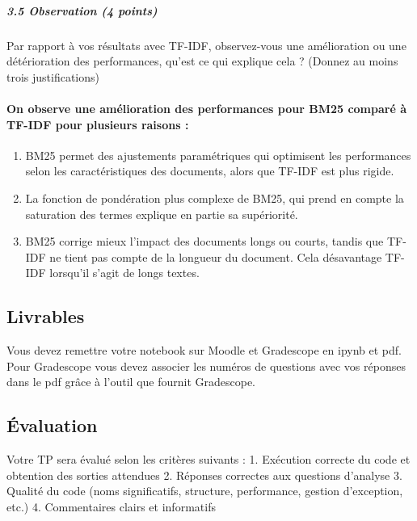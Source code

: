 \documentclass[11pt]{article}
\providecommand{\tightlist}{%
      \setlength{\itemsep}{0pt}\setlength{\parskip}{0pt}}
\begin{document}
    \subparagraph{3.5 Observation (4 points)}\label{observation-4-points}

Par rapport à vos résultats avec TF-IDF, observez-vous une amélioration
ou une détérioration des performances, qu'est ce qui explique cela ?
(Donnez au moins trois justifications)

    \paragraph{On observe une amélioration des performances pour BM25
comparé à TF-IDF pour plusieurs raisons
:}\label{on-observe-une-amuxe9lioration-des-performances-pour-bm25-comparuxe9-uxe0-tf-idf-pour-plusieurs-raisons}

\begin{enumerate}
\def\labelenumi{\arabic{enumi}.}
\tightlist
\item
  BM25 permet des ajustements paramétriques qui optimisent les
  performances selon les caractéristiques des documents, alors que
  TF-IDF est plus rigide.
\item
  La fonction de pondération plus complexe de BM25, qui prend en compte
  la saturation des termes explique en partie sa supériorité.
\item
  BM25 corrige mieux l'impact des documents longs ou courts, tandis que
  TF-IDF ne tient pas compte de la longueur du document. Cela
  désavantage TF-IDF lorsqu'il s'agit de longs textes.
\end{enumerate}

    \subsection{Livrables}\label{livrables}

Vous devez remettre votre notebook sur Moodle et Gradescope en ipynb et
pdf. Pour Gradescope vous devez associer les numéros de questions avec
vos réponses dans le pdf grâce à l'outil que fournit Gradescope.

\subsection{Évaluation}\label{uxe9valuation}

Votre TP sera évalué selon les critères suivants : 1. Exécution correcte
du code et obtention des sorties attendues 2. Réponses correctes aux
questions d'analyse 3. Qualité du code (noms significatifs, structure,
performance, gestion d'exception, etc.) 4. Commentaires clairs et
informatifs


    
    
    
\end{document}
